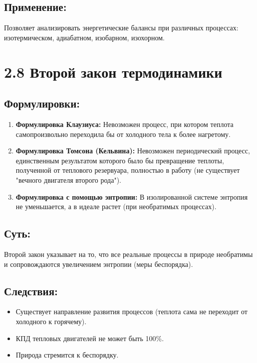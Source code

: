 \documentclass[a4paper,12pt]{article}
\begin{document}
\vspace{-9pt}
\subsection*{Применение:}
\vspace{-3pt}
Позволяет анализировать энергетические балансы при различных процессах: изотермическом, адиабатном, изобарном, изохорном.



\section*{2.8 Второй закон термодинамики}
\vspace{-9pt}
\subsection*{Формулировки:}
\vspace{-3pt}
\begin{enumerate}[itemsep=0pt, topsep=0pt, parsep=3pt]
    \item \textbf{Формулировка Клаузиуса:} Невозможен процесс, при котором теплота самопроизвольно переходила бы от холодного тела к более нагретому.
    \item \textbf{Формулировка Томсона (Кельвина):} Невозможен периодический процесс, единственным результатом которого было бы превращение теплоты, полученной от теплового резервуара, полностью в работу (не существует "вечного двигателя второго рода").
    \item \textbf{Формулировка с помощью энтропии:} В изолированной системе энтропия не уменьшается, а в идеале растет (при необратимых процессах).
\end{enumerate}

\vspace{-9pt}
\subsection*{Суть:}
\vspace{-3pt}
Второй закон указывает на то, что все реальные процессы в природе необратимы и сопровождаются увеличением энтропии (меры беспорядка).
\newpage
\vspace{-9pt}
\subsection*{Следствия:}
\vspace{-3pt}
\begin{itemize}
    \item Существует направление развития процессов (теплота сама не переходит от холодного к горячему).
    \item КПД тепловых двигателей не может быть 100\%.
    \item Природа стремится к беспорядку.
\end{itemize}
\end{document}
